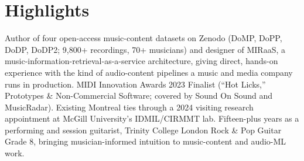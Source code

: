 \documentclass[11pt]{article}
\begin{document}
\section*{Highlights}
Author of four open-access music-content datasets on Zenodo (DoMP, DoPP, DoDP, DoDP2; 9,800+ recordings, 70+ musicians) and designer of MIRaaS, a music-information-retrieval-as-a-service architecture, giving direct, hands-on experience with the kind of audio-content pipelines a music and media company runs in production. MIDI Innovation Awards 2023 Finalist (``Hot Licks,'' Prototypes \& Non-Commercial Software; covered by Sound On Sound and MusicRadar). Existing Montreal ties through a 2024 visiting research appointment at McGill University's IDMIL/CIRMMT lab. Fifteen-plus years as a performing and session guitarist, Trinity College London Rock \& Pop Guitar Grade 8, bringing musician-informed intuition to music-content and audio-ML work.
\end{document}
